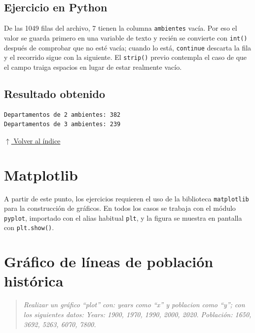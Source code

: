 \documentclass[12pt]{article}
\newcommand{\codigopython}[2]{%
}
\newcommand{\volverindice}{%
    \vspace{1em}%
    \begin{flushright}%
        \hyperlink{indice}{\small $\uparrow$ Volver al índice}%
    \end{flushright}%
}
\newcommand{\enunciado}[1]{%
    \begin{quote}
        \itshape #1
    \end{quote}
}
\begin{document}
\subsection*{Ejercicio en Python}

De las 1049 filas del archivo, 7 tienen la columna \texttt{ambientes} vacía. Por eso el valor se guarda primero en una variable de texto y recién se convierte con \texttt{int()} después de comprobar que no esté vacía; cuando lo está, \texttt{continue} descarta la fila y el recorrido sigue con la siguiente. El \texttt{strip()} previo contempla el caso de que el campo traiga espacios en lugar de estar realmente vacío.

\codigopython{04}{Conteo de departamentos de 2 y 3 ambientes}

\subsection*{Resultado obtenido}

\begin{lstlisting}[style=salida]
Departamentos de 2 ambientes: 382
Departamentos de 3 ambientes: 239
\end{lstlisting}

\volverindice


\newpage
{}
\section*{Matplotlib}

A partir de este punto, los ejercicios requieren el uso de la biblioteca \texttt{matplotlib} para la construcción de gráficos. En todos los casos se trabaja con el módulo \texttt{pyplot}, importado con el alias habitual \texttt{plt}, y la figura se muestra en pantalla con \texttt{plt.show()}.


\newpage
\section{Gráfico de líneas de población histórica}

\enunciado{Realizar un gráfico \enquote{plot} con: years como \enquote{x} y poblacion como \enquote{y}; con los siguientes datos: Years: 1900, 1970, 1990, 2000, 2020. Población: 1650, 3692, 5263, 6070, 7800.}
\end{document}
